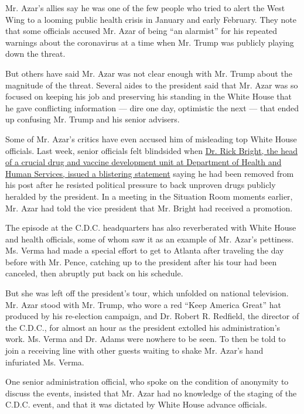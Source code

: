 Mr. Azar's allies say he was one of the few people who tried to alert
the West Wing to a looming public health crisis in January and early
February. They note that some officials accused Mr. Azar of being ``an
alarmist'' for his repeated warnings about the coronavirus at a time
when Mr. Trump was publicly playing down the threat.

But others have said Mr. Azar was not clear enough with Mr. Trump about
the magnitude of the threat. Several aides to the president said that
Mr. Azar was so focused on keeping his job and preserving his standing
in the White House that he gave conflicting information --- dire one
day, optimistic the next --- that ended up confusing Mr. Trump and his
senior advisers.

Some of Mr. Azar's critics have even accused him of misleading top White
House officials. Last week, senior officials felt blindsided when
\href{https://www.nytimes3xbfgragh.onion/2020/04/22/us/politics/rick-bright-trump-hydroxychloroquine-coronavirus.html}{Dr.
Rick Bright, the head of a crucial drug and vaccine development unit at
Department of Health and Human Services, issued a blistering statement}
saying he had been removed from his post after he resisted political
pressure to back unproven drugs publicly heralded by the president. In a
meeting in the Situation Room moments earlier, Mr. Azar had told the
vice president that Mr. Bright had received a promotion.

The episode at the C.D.C. headquarters has also reverberated with White
House and health officials, some of whom saw it as an example of Mr.
Azar's pettiness. Ms. Verma had made a special effort to get to Atlanta
after traveling the day before with Mr. Pence, catching up to the
president after his tour had been canceled, then abruptly put back on
his schedule.

But she was left off the president's tour, which unfolded on national
television. Mr. Azar stood with Mr. Trump, who wore a red ``Keep America
Great'' hat produced by his re-election campaign, and Dr. Robert R.
Redfield, the director of the C.D.C., for almost an hour as the
president extolled his administration's work. Ms. Verma and Dr. Adams
were nowhere to be seen. To then be told to join a receiving line with
other guests waiting to shake Mr. Azar's hand infuriated Ms. Verma.

One senior administration official, who spoke on the condition of
anonymity to discuss the events, insisted that Mr. Azar had no knowledge
of the staging of the C.D.C. event, and that it was dictated by White
House advance officials.

